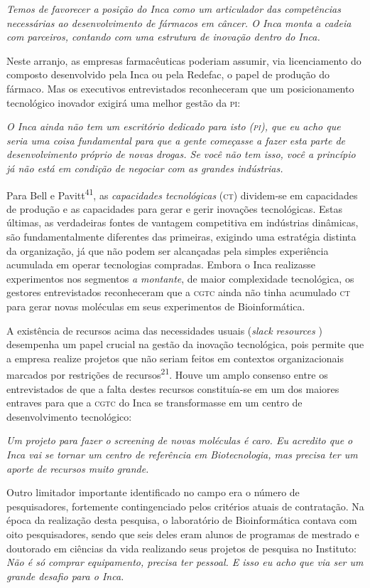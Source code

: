 \documentclass{article}
\begin{document}
\textit{Temos de favorecer a posição do Inca como um articulador das
competências necessárias ao desenvolvimento de fármacos em câncer. O Inca monta
a cadeia com parceiros, contando com uma estrutura de inovação dentro do Inca.}

Neste arranjo, as empresas farmacêuticas poderiam assumir, via licenciamento do
composto desenvolvido pela Inca ou pela Redefac, o papel de produção do
fármaco\textit{.}
Mas os executivos entrevistados reconheceram que um posicionamento tecnológico
inovador exigirá uma melhor gestão da \textsc{pi}:

\textit{O Inca ainda não tem um escritório dedicado para isto (\textsc{pi}), que eu acho
que seria uma coisa fundamental para que a gente começasse a fazer esta parte de
desenvolvimento próprio de novas drogas. Se você não tem isso, você a princípio
já não está em condição de negociar com as grandes indústrias.}

Para Bell e Pavitt\textsuperscript{41}, as \textit{capacidades tecnológicas}
(\textsc{ct}) dividem-se em capacidades de produção e as capacidades para gerar e gerir
inovações tecnológicas. Estas últimas, as verdadeiras fontes de vantagem
competitiva em indústrias dinâmicas, são fundamentalmente diferentes das
primeiras, exigindo uma estratégia distinta da organização, já que não podem ser
alcançadas pela simples experiência acumulada em operar tecnologias compradas.
Embora o Inca realizasse experimentos nos segmentos \textit{a montante}, de maior complexidade tecnológica, os gestores entrevistados reconheceram que
a \textsc{cgtc} ainda não tinha acumulado \textsc{ct} para gerar novas moléculas em seus
experimentos de Bioinformática.

A existência de recursos acima das necessidades usuais (\textit{slack resources}
) desempenha um papel crucial na gestão da inovação tecnológica, pois permite
que a empresa realize projetos que não seriam feitos em contextos
organizacionais marcados por restrições de recursos\textsuperscript{21}. Houve um amplo consenso entre os entrevistados de que a falta destes recursos
constituía-se em um dos maiores entraves para que a \textsc{cgtc} do Inca se
transformasse em um centro de desenvolvimento tecnológico:

\textit{Um projeto para fazer o screening de novas moléculas é caro. Eu acredito
que o Inca vai se tornar um centro de referência em Biotecnologia, mas precisa
ter um aporte de recursos muito grande.}

Outro limitador importante identificado no campo era o número de pesquisadores,
fortemente contingenciado pelos critérios atuais de contratação. Na época da
realização desta pesquisa, o laboratório de Bioinformática contava com oito
pesquisadores, sendo que seis deles eram alunos de programas de mestrado e
doutorado em ciências da vida realizando seus projetos de pesquisa no Instituto:
\textit{Não é só comprar equipamento, precisa ter pessoal. E isso eu acho que
via ser um grande desafio para o Inca.}
\end{document}
